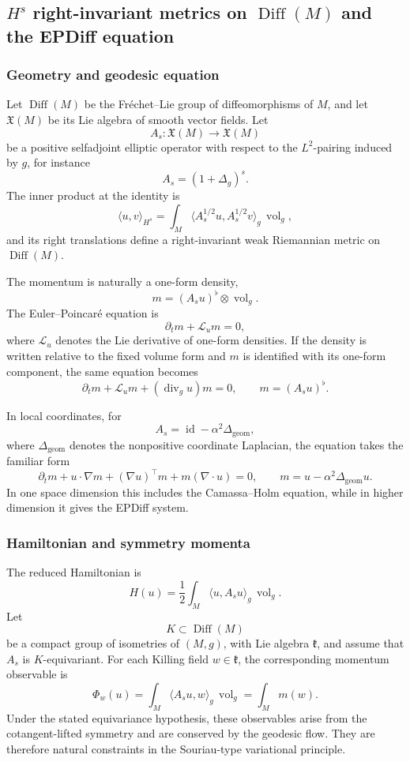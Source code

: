 \documentclass[11pt,reqno]{amsart}
\begin{document}
\subsection{$H^s$ right-invariant metrics on $\operatorname{Diff}(M)$
and the EPDiff equation}

\subsubsection*{Geometry and geodesic equation}

Let $\operatorname{Diff}(M)$ be the Fréchet--Lie group of
diffeomorphisms of $M$, and let $\mathfrak X(M)$ be its Lie algebra of
smooth vector fields. Let
\[
A_s\colon\mathfrak X(M)\longrightarrow\mathfrak X(M)
\]
be a positive selfadjoint elliptic operator with respect to the
$L^2$-pairing induced by $g$, for instance
\[
A_s=(1+\Delta_g)^s.
\]
The inner product at the identity is
\[
\langle u,v\rangle_{H^s}
=
\int_M
\langle A_s^{1/2}u,A_s^{1/2}v\rangle_g
\,\operatorname{vol}_g,
\]
and its right translations define a right-invariant weak Riemannian
metric on $\operatorname{Diff}(M)$.

The momentum is naturally a one-form density,
\[
m=(A_su)^\flat\otimes\operatorname{vol}_g.
\]
The Euler--Poincaré equation is
\[
\partial_t m+\mathcal L_u m=0,
\]
where $\mathcal L_u$ denotes the Lie derivative of one-form densities.
If the density is written relative to the fixed volume form and $m$ is
identified with its one-form component, the same equation becomes
\[
\partial_t m+\mathcal L_u m+(\operatorname{div}_g u)m=0,
\qquad
m=(A_su)^\flat.
\]

In local coordinates, for
\[
A_s=\operatorname{id}-\alpha^2\Delta_{\mathrm{geom}},
\]
where $\Delta_{\mathrm{geom}}$ denotes the nonpositive coordinate
Laplacian, the equation takes the familiar form
\[
\partial_t m
+
u\cdot\nabla m
+
(\nabla u)^\top m
+
m(\nabla\cdot u)
=
0,
\qquad
m=u-\alpha^2\Delta_{\mathrm{geom}}u.
\]
In one space dimension this includes the Camassa--Holm equation, while
in higher dimension it gives the EPDiff system.

\subsubsection*{Hamiltonian and symmetry momenta}

The reduced Hamiltonian is
\[
H(u)
=
\frac12
\int_M
\langle u,A_su\rangle_g
\,\operatorname{vol}_g.
\]
Let
\[
K\subset\operatorname{Diff}(M)
\]
be a compact group of isometries of $(M,g)$, with Lie algebra
$\mathfrak k$, and assume that $A_s$ is $K$-equivariant. For each
Killing field $w\in\mathfrak k$, the corresponding momentum observable
is
\[
\Phi_w(u)
=
\int_M
\langle A_su,w\rangle_g
\,\operatorname{vol}_g
=
\int_M
m(w).
\]
Under the stated equivariance hypothesis, these observables arise from
the cotangent-lifted symmetry and are conserved by the geodesic flow.
They are therefore natural constraints in the Souriau-type variational
principle.
\end{document}
